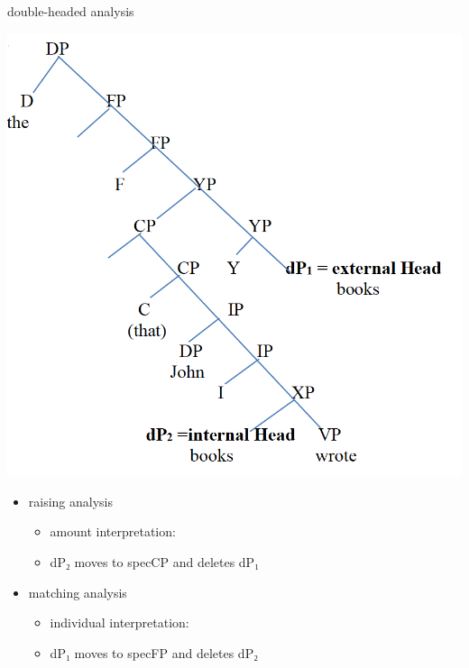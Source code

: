 \documentclass[12pt]{beamer}
\begin{document}

\begin{frame}{ double-headed analysis }

	\begin{minipage}[t]{0.47\textwidth}
  \includegraphics[width=1.1\linewidth]{cinque-tree}    \pause

  \end{minipage}\hfill\vline\hfill
	\begin{minipage}[t]{0.47\textwidth}
    \vspace{-15em}
\begin{itemize}
  \item raising analysis
  \begin{itemize}
    \item amount interpretation: 
    \item dP₂ moves to specCP and deletes dP₁
  \end{itemize} \pause
  \item matching analysis
  \begin{itemize}
    \item individual interpretation: 
    \item dP₁ moves to specFP and deletes dP₂
  \end{itemize}
\end{itemize}

	\end{minipage}

\end{frame}
\end{document}
